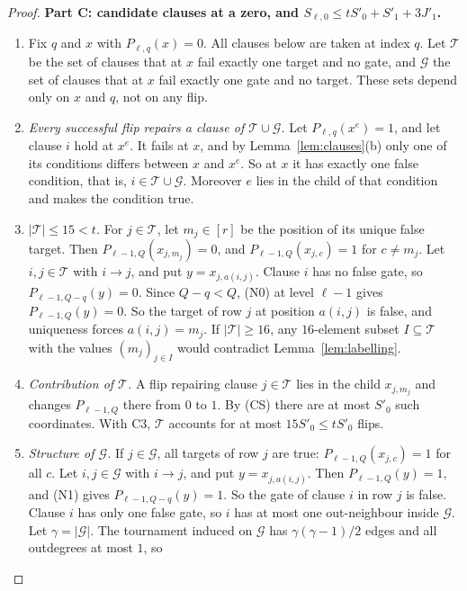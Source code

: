 \documentclass[11pt]{article}
\theoremstyle{definition}
\theoremstyle{remark}
\begin{document}
\begin{proof}
\medskip\noindent\textbf{Part C: candidate clauses at a zero, and \(S_{\ell,0}\le tS'_0+S'_1+3J'_1\).}
\begin{enumerate}[label=\textbf{C\arabic*.},leftmargin=*]
\item Fix \(q\) and \(x\) with \(P_{\ell,q}(x)=0\). All clauses below are taken at index \(q\). Let \(\mathcal T\) be the set of clauses that at \(x\) fail exactly one target and no gate, and \(\mathcal G\) the set of clauses that at \(x\) fail exactly one gate and no target. These sets depend only on \(x\) and \(q\), not on any flip.
\item \emph{Every successful flip repairs a clause of \(\mathcal T\cup\mathcal G\).} Let \(P_{\ell,q}(x^e)=1\), and let clause \(i\) hold at \(x^e\). It fails at \(x\), and by Lemma~\ref{lem:clauses}(b) only one of its conditions differs between \(x\) and \(x^e\). So at \(x\) it has exactly one false condition, that is, \(i\in\mathcal T\cup\mathcal G\). Moreover \(e\) lies in the child of that condition and makes the condition true.
\item \emph{\(|\mathcal T|\le15<t\).} For \(j\in\mathcal T\), let \(m_j\in[r]\) be the position of its unique false target. Then \(P_{\ell-1,Q}(x_{j,m_j})=0\), and \(P_{\ell-1,Q}(x_{j,c})=1\) for \(c\ne m_j\). Let \(i,j\in\mathcal T\) with \(i\to j\), and put \(y=x_{j,a(i,j)}\). Clause \(i\) has no false gate, so \(P_{\ell-1,Q-q}(y)=0\). Since \(Q-q<Q\), (N0) at level \(\ell-1\) gives \(P_{\ell-1,Q}(y)=0\). So the target of row \(j\) at position \(a(i,j)\) is false, and uniqueness forces \(a(i,j)=m_j\). If \(|\mathcal T|\ge16\), any \(16\)-element subset \(I\subseteq\mathcal T\) with the values \((m_j)_{j\in I}\) would contradict Lemma~\ref{lem:labelling}.
\item \emph{Contribution of \(\mathcal T\).} A flip repairing clause \(j\in\mathcal T\) lies in the child \(x_{j,m_j}\) and changes \(P_{\ell-1,Q}\) there from \(0\) to \(1\). By (CS) there are at most \(S'_0\) such coordinates. With C3, \(\mathcal T\) accounts for at most \(15S'_0\le tS'_0\) flips.
\item \emph{Structure of \(\mathcal G\).} If \(j\in\mathcal G\), all targets of row \(j\) are true: \(P_{\ell-1,Q}(x_{j,c})=1\) for all \(c\). Let \(i,j\in\mathcal G\) with \(i\to j\), and put \(y=x_{j,a(i,j)}\). Then \(P_{\ell-1,Q}(y)=1\), and (N1) gives \(P_{\ell-1,Q-q}(y)=1\). So the gate of clause \(i\) in row \(j\) is false. Clause \(i\) has only one false gate, so \(i\) has at most one out-neighbour inside \(\mathcal G\). Let \(\gamma=|\mathcal G|\). The tournament induced on \(\mathcal G\) has \(\gamma(\gamma-1)/2\) edges and all outdegrees at most \(1\), so

\end{enumerate}
\end{proof}
\end{document}
